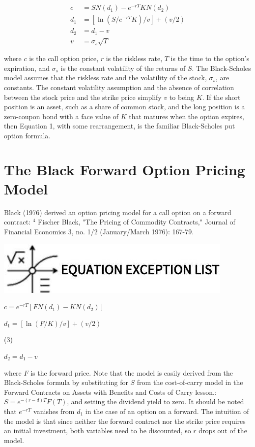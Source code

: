 \documentclass[11pt]{article}
\begin{document}
$$
\begin{aligned}
c & =S N\left(d_{1}\right)-e^{-r T} K N\left(d_{2}\right) \\
d_{1} & =\left[\ln \left(S / e^{-r T} K\right) / v\right]+(v / 2) \\
d_{2} & =d_{1}-v \\
v & =\sigma_{s} \sqrt{T}
\end{aligned}
$$

where $c$ is the call option price, $r$ is the riskless rate, $T$ is the time to the option's expiration, and $\sigma_{s}$ is the constant volatility of the returns of $S$. The Black-Scholes model assumes that the riskless rate and the volatility of the stock, $\sigma_{s}$, are constants. The constant volatility assumption and the absence of correlation between the stock price and the strike price simplify $v$ to being $K$. If the short position is an asset, such as a share of common stock, and the long position is a zero-coupon bond with a face value of $K$ that matures when the option expires, then Equation 1, with some rearrangement, is the familiar Black-Scholes put option formula.

\section*{The Black Forward Option Pricing Model}
Black (1976) derived an option pricing model for a call option on a forward contract: ${ }^{4}$ Fischer Black, "The Pricing of Commodity Contracts," Journal of Financial Economics 3, no. 1/2 (January/March 1976): 167-79.

\begin{center}
\includegraphics[max width=\textwidth]{2024_04_11_7c728ae44168a8fb26cag-3}
\end{center}

$c=e^{-r T}\left[F N\left(d_{1}\right)-K N\left(d_{2}\right)\right]$

$d_{1}=[\ln (F / K) / v]+(v / 2)$

(3)

$d_{2}=d_{1}-v$

where $F$ is the forward price. Note that the model is easily derived from the Black-Scholes formula by substituting for $S$ from the cost-of-carry model in the Forward Contracts on Assets with Benefits and Costs of Carry lesson.: $S=e^{-(r-d) T} F(T)$, and setting the dividend yield to zero. It should be noted that $e^{-r T}$ vanishes from $d_{1}$ in the case of an option on a forward. The intuition of the model is that since neither the forward contract nor the strike price requires an initial investment, both variables need to be discounted, so $r$ drops out of the model.
\end{document}
